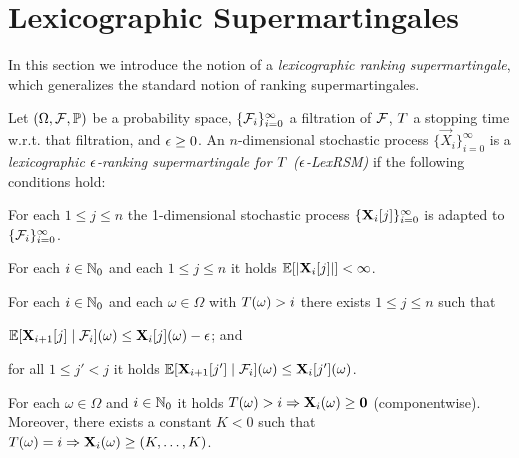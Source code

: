 \section{Lexicographic Supermartingales}
\label{sec:lexicographic}

In this section we introduce the notion of a \emph{lexicographic ranking 
supermartingale}, which generalizes the standard notion of ranking 
supermartingales.

\begin{definition}
Let $(\Omega,\mathcal{F},\mathbb{P})$ be a probability space, 
$\{\mathcal{F}_i\}_{i=0}^{\infty}$ a filtration of $\mathcal{F}$, $T$ a stopping 
time w.r.t. that filtration, and 
$\epsilon\geq 0$. 
An $n$-dimensional stochastic process $\{\vec{X}_{i}\}_{i=0}^{\infty}$ is a 
\emph{lexicographic $\epsilon$-ranking supermartingale for $T$ 
($\epsilon$-LexRSM)} if the 
following 
conditions hold:
\begin{compactenum}
\item For each $1\leq j \leq n$ the 1-dimensional stochastic process 
$\{\mathbf{X}_{i}[j]\}_{i=0}^{\infty}$ is adapted to 
$\{\mathcal{F}_i\}_{i=0}^{\infty}$.
\item For each $i\in \mathbb{N}_0$ and each $1\leq j \leq n$ it holds 
$\mathbb{E}[|\mathbf{X}_{i}[j]|]<\infty$.
\item For each $i\in \mathbb{N}_0$ and each $\omega\in \Omega$ with 
$T(\omega)>i$ there exists $1\leq j 
\leq n$ such that
\begin{compactitem}
	\item $\mathbb{E}[\mathbf{X}_{i+1}[j]\mid 
	\mathcal{F}_i](\omega)\leq\mathbf{X}_{i}[j](\omega) - 
	\epsilon$; and
	\item for all $1 \leq j' < j$ it holds $\mathbb{E}[\mathbf{X}_{i+1}[j']\mid 
	\mathcal{F}_i](\omega)\leq\mathbf{X}_{i}[j'](\omega)$.
\end{compactitem}
\item For each $\omega \in \Omega$ and $i\in \mathbb{N}_0$ it holds 
$T(\omega)>i 
\Rightarrow \mathbf{X}_i (\omega)\geq \mathbf{0}$ (componentwise). Moreover, there 
exists a constant $K<0$ such that $T(\omega)=i 
\Rightarrow \mathbf{X}_i (\omega)\geq (K,\dots,K)$.
\end{compactenum}
\end{definition}


